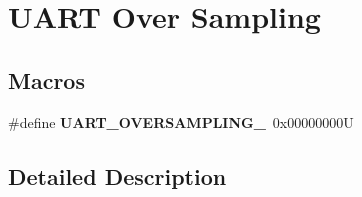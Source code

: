\hypertarget{group___u_a_r_t___over___sampling}{}\section{U\+A\+RT Over Sampling}
\label{group___u_a_r_t___over___sampling}
\subsection*{Macros}
\begin{DoxyCompactItemize}
\item 
\mbox{\label{group___u_a_r_t___over___sampling_gaa6a320ec65d248d76f21de818db1a2f0}} 
\#define {\bfseries U\+A\+R\+T\+\_\+\+O\+V\+E\+R\+S\+A\+M\+P\+L\+I\+N\+G\+\_}~0x00000000U
\end{DoxyCompactItemize}


\subsection{Detailed Description}
